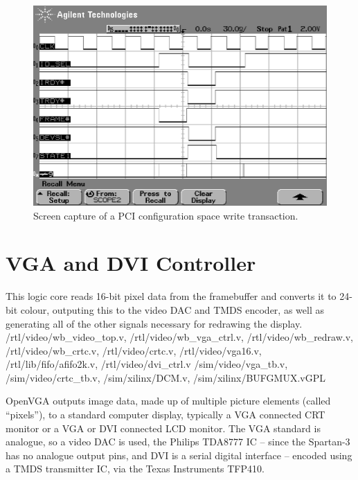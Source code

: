 \begin{figure}[h!]
\begin{center}
\includegraphics[width=\linewidth]{images/cfg_space_cap.eps}
\end{center}
\caption[PCI configuration space write transaction]{Screen capture of a PCI
configuration space write transaction.}
\label{PCI_CFG_Cap}
\end{figure}


\section{VGA and DVI Controller}
\label{VIDEO}

{This logic core reads 16-bit pixel data from the framebuffer and converts it to
24-bit colour, outputing this to the video DAC and TMDS encoder, as well as
generating all of the other signals necessary for redrawing the display.}
{/rtl/video/wb\_video\_top.v, /rtl/video/wb\_vga\_ctrl.v,
/rtl/video/wb\_redraw.v, /rtl/video/wb\_crtc.v, /rtl/video/crtc.v,
/rtl/video/vga16.v, /rtl/lib/fifo/afifo2k.v, /rtl/video/dvi\_ctrl.v}
{/sim/video/vga\_tb.v, /sim/video/crtc\_tb.v, /sim/xilinx/DCM.v,
/sim/xilinx/BUFGMUX.v}{GPL}

OpenVGA outputs image data, made up of multiple picture elements (called
``pixels''), to a standard computer display, typically a VGA connected CRT
monitor or a VGA or DVI connected LCD monitor. The VGA standard is analogue, so a
video DAC is used, the Philips TDA8777 IC -- since the Spartan-3 has no analogue
output pins, and DVI is a serial digital interface -- encoded using a TMDS
transmitter IC, via the Texas Instruments TFP410.

